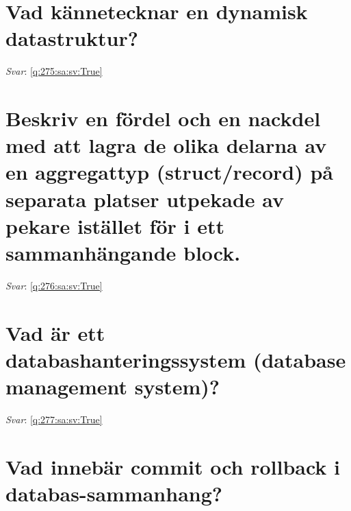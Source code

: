 \documentclass[a4paper,11pt,oneside]{book}
\begin{document}
\begin{sloppypar}
\section{Vad k\"annetecknar en dynamisk datastruktur?}

\label{q:275:sa:sv:False}

\vspace{2cm}

\noindent\makebox[\textwidth]{\hrulefill}

\vspace{1cm}

\textit{Svar}: \autoref{q:275:sa:sv:True}



\section{Beskriv en f\"ordel och en nackdel med att lagra de olika delarna av en aggregattyp (struct/record) p\r{a} separata platser utpekade av pekare ist\"allet f\"or i ett sammanh\"angande block.}

\label{q:276:sa:sv:False}

\vspace{2cm}

\noindent\makebox[\textwidth]{\hrulefill}

\vspace{1cm}

\textit{Svar}: \autoref{q:276:sa:sv:True}



\section{Vad \"ar ett databashanteringssystem (database management system)?}

\label{q:277:sa:sv:False}

\vspace{2cm}

\noindent\makebox[\textwidth]{\hrulefill}

\vspace{1cm}

\textit{Svar}: \autoref{q:277:sa:sv:True}



\section{Vad inneb\"ar commit och rollback i databas-sammanhang?}

\label{q:278:sa:sv:False}


\end{sloppypar}
\end{document}
